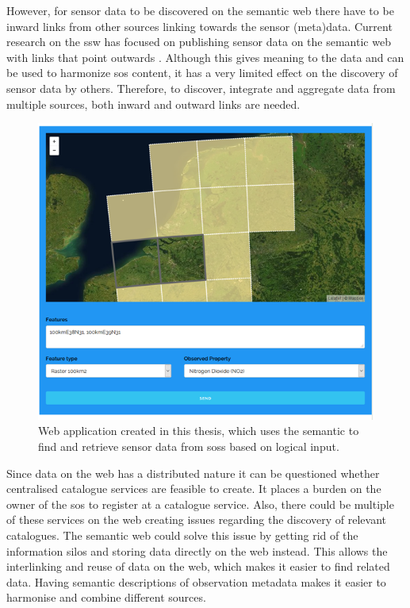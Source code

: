 However, for sensor data to be discovered on the semantic web there have to be inward links from other sources linking towards the sensor (meta)data. Current research on the \ac{ssw} has focused on publishing sensor data on the semantic web with links that point outwards \citep{SSW:Janowicz, SSW:Pschorr, SSW:Atkinson}. Although this gives meaning to the data and can be used to harmonize \ac{sos} content, it has a very limited effect on the discovery of sensor data by others. Therefore, to discover, integrate and aggregate data from multiple sources, both inward and outward links are needed.  


\begin{figure}
	\centering
	\includegraphics[width=0.8\linewidth]{figs/interface1.PNG}
	\caption{Web application created in this thesis, which uses the semantic to find and retrieve sensor data from \aclp*{sos} based on logical input.}
	\label{fig:logical}
\end{figure}

Since data on the web has a distributed nature it can be questioned whether centralised catalogue services are feasible to create. It places a burden on the owner of the \ac{sos} to register at a catalogue service. Also, there could be multiple of these services on the web creating issues regarding the discovery of relevant catalogues. The semantic web could solve this issue by getting rid of the information silos and storing data directly on the web instead. This allows the interlinking and reuse of data on the web, which makes it easier to find related data. Having semantic descriptions of observation metadata makes it easier to harmonise and combine different sources. 

